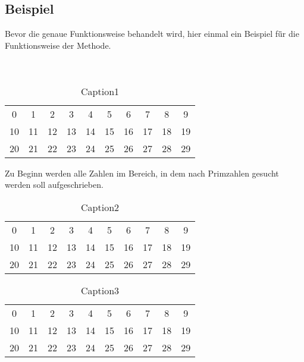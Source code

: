 \documentclass[12pt, a4paper, titlepage,twoside]{article}
\begin{document}
	\subsection{Beispiel}
	Bevor die genaue Funktionsweise behandelt wird, hier einmal ein Beispiel f\"ür die Funktionsweise der Methode.\\
	\ \\
	\ \\
	 \begin{table}[!ht] 
	 	\centering
	 	
	 		\begin{tabular}{|c|c|c|c|c|c|c|c|c|c|}
	 			\hline
	 			0  &  1 &  2 &  3 &  4 &  5 &  6 &  7 &  8 &  9 \\
	 			10 & 11 & 12 & 13 & 14 & 15 & 16 & 17 & 18 & 19 \\
	 			20 & 21 & 22 & 23 & 24 & 25 & 26 & 27 & 28 & 29 \\
	 			\hline
	 		\end{tabular}
		\caption{Caption1}
		\label{tab:eratosthenes1}
	 \end{table}
	 
	 Zu Beginn werden alle Zahlen im Bereich, in dem nach Primzahlen gesucht werden soll aufgeschrieben.
	 
	 \begin{table}[!ht] 
	 	\centering
	 		\begin{tabular}{|c|c|c|c|c|c|c|c|c|c|}
	 			\hline
	 			 \cellcolor{red}0  &  \cellcolor{red}1 &  2 &  3 &  4 &  5 &  6 &  7 &  8 &  9 \\
	 			 10 & 11 & 12 & 13 & 14 & 15 & 16 & 17 & 18 & 19 \\
	 			 20 & 21 & 22 & 23 & 24 & 25 & 26 & 27 & 28 & 29 \\
	 			\hline
	 		\end{tabular}
		\caption{Caption2}
		\label{tab:eratosthenes1}
	 \end{table}
	 		
	 \begin{table}[!ht] 
	 	\centering
	 		\begin{tabular}{|c|c|c|c|c|c|c|c|c|c|}
	 			\hline
	 			 \cellcolor{red}0  & \cellcolor{red} 1 &  2 &  3 &  \cellcolor{red}4 &  5 & \cellcolor{red} 6 &  7 & \cellcolor{red} 8 &  9 \\
	 			 \cellcolor{red}10 & 11 & \cellcolor{red}12 & 13 & \cellcolor{red}14 & 15 & \cellcolor{red}16 & 17 & \cellcolor{red}18 & 19 \\
	 			 \cellcolor{red}20 & 21 & \cellcolor{red}22 & 23 & \cellcolor{red}24 & 25 & \cellcolor{red}26 & 27 & \cellcolor{red}28 & 29 \\
	 			 \hline
	 		\end{tabular}
		\caption{Caption3}
		\label{tab:eratosthenes3}
	 \end{table}
	 		
\end{document}
